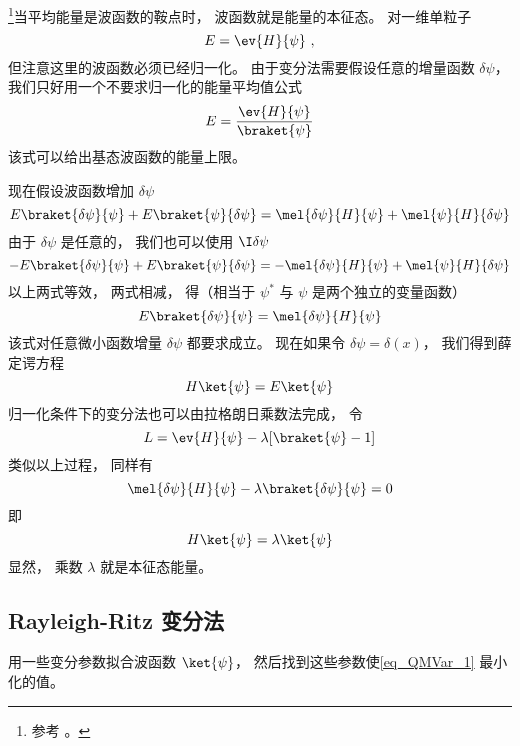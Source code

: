 

\footnote{参考 \cite{Bransden}。}当平均能量是波函数的鞍点时， 波函数就是能量的本征态。 对一维单粒子
\begin{equation}
E = \ev{H}{\psi}~,
\end{equation}
但注意这里的波函数必须已经归一化。 由于变分法需要假设任意的增量函数 $\delta \psi $，  我们只好用一个不要求归一化的能量平均值公式
\begin{equation}\label{eq_QMVar_1}
E = \frac{\ev{H}{\psi}}{\braket{\psi}}
\end{equation}
该式可以给出基态波函数的能量上限。

现在假设波函数增加 $\delta \psi$ 
\begin{equation}
E \braket{\delta\psi}{\psi} + E\braket{\psi}{\delta\psi}
= \mel{\delta \psi}{H}{\psi} + \mel{\psi}{H}{\delta\psi}
\end{equation}
由于 $\delta\psi$ 是任意的， 我们也可以使用 $\I\delta\psi$ 
\begin{equation}
-E \braket{\delta\psi}{\psi} + E \braket{\psi}{\delta\psi}
= -\mel{\delta\psi}{H}{\psi} + \mel{\psi}{H}{\delta\psi}
\end{equation}
以上两式等效， 两式相减， 得（相当于 $\psi^*$ 与 $\psi$ 是两个独立的变量函数）
\begin{equation}
E\braket{\delta\psi}{\psi} = \mel{\delta\psi}{H}{\psi}
\end{equation}
该式对任意微小函数增量 $\delta\psi $ 都要求成立。 现在如果令 $\delta \psi  = \delta (x)$，  我们得到薛定谔方程
\begin{equation}
H \ket{\psi} = E\ket{\psi}
\end{equation}
归一化条件下的变分法也可以由拉格朗日乘数法完成， 令
\begin{equation}
L = \ev{H}{\psi} - \lambda [\braket{\psi} - 1]
\end{equation}
类似以上过程， 同样有
\begin{equation}
\mel{\delta\psi}{H}{\psi} - \lambda\braket{\delta\psi}{\psi} = 0
\end{equation}
即
\begin{equation}
H \ket{\psi} = \lambda \ket{\psi}
\end{equation}
显然， 乘数 $\lambda $ 就是本征态能量。

\subsection{Rayleigh-Ritz 变分法}
用一些变分参数拟合波函数 $\ket{\psi}$， 然后找到这些参数使\autoref{eq_QMVar_1} 最小化的值。

